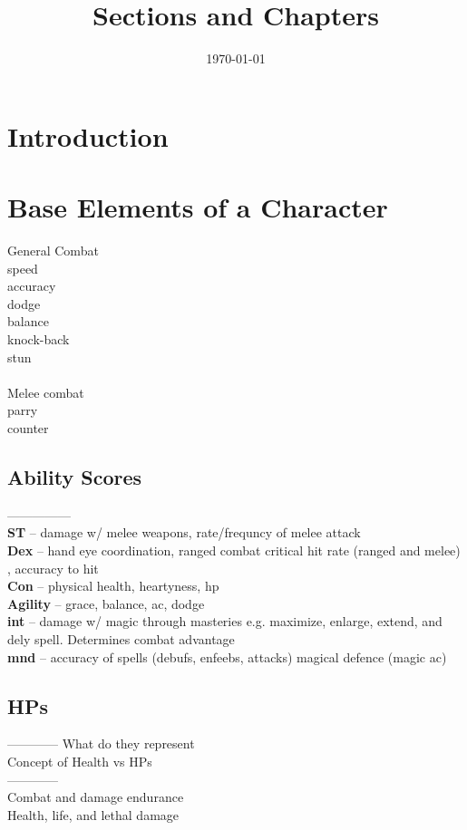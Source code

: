 \documentclass{article}
\title{Sections and Chapters}
\author{}
\date{\today}
\begin{document}
 
\maketitle
 
\section{Introduction}

\section{Base Elements of a Character}

General Combat\\
speed\\
accuracy\\
dodge\\
balance\\
knock-back\\
stun\\
\\
Melee combat\\
parry\\
counter

\subsection{Ability Scores}
---------------\\
\textbf{ST} – damage w/ melee weapons, rate/frequncy of melee attack\\
\textbf{Dex} – hand eye coordination, ranged combat critical hit rate (ranged and melee) , accuracy to hit\\
\textbf{Con} – physical health, heartyness, hp\\
\textbf{Agility} – grace, balance, ac, dodge\\
\textbf{int} – damage w/ magic through masteries e.g. maximize, enlarge, extend, and dely spell. Determines combat advantage\\
\textbf{mnd} – accuracy of spells (debufs, enfeebs, attacks) magical defence (magic ac)

\subsection{HPs}
------------
What do they represent\\

Concept of Health vs HPs\\
------------\\
Combat and damage endurance\\
Health, life, and lethal damage\\
\end{document}
